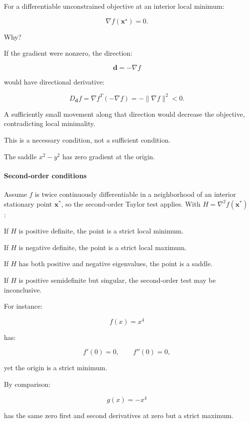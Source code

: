 \hypertarget{02-foundations-ii-ch026-first-order-necessary-condition}{}

For a differentiable unconstrained objective at an interior local minimum:

\[
\boxed{\nabla f(\mathbf x^\star)=0}.
\]

Why?

If the gradient were nonzero, the direction:

\[
\mathbf d=-\nabla f
\]

would have directional derivative:

\[
D_{\mathbf d}f = \nabla f^T(-\nabla f) = -\|\nabla f\|^2<0.
\]

A sufficiently small movement along that direction would decrease the objective, contradicting local minimality.

This is a necessary condition, not a sufficient condition.

The saddle \(x^2-y^2\) has zero gradient at the origin.

\paragraph{Second-order conditions}\label{02-foundations-ii-ch026-second-order-conditions}

\hypertarget{02-foundations-ii-ch026-second-order-conditions}{}

Assume \(f\) is twice continuously differentiable in a neighborhood of an interior stationary point \(\mathbf x^*\), so the second-order Taylor test applies. With \(H=\nabla^2 f(\mathbf x^*)\):

If \(H\) is positive definite, the point is a strict local minimum.

If \(H\) is negative definite, the point is a strict local maximum.

If \(H\) has both positive and negative eigenvalues, the point is a saddle.

If \(H\) is positive semidefinite but singular, the second-order test may be inconclusive.

For instance:

\[
f(x)=x^4
\]

has:

\[
f'(0)=0,\qquad f''(0)=0,
\]

yet the origin is a strict minimum.

By comparison:

\[
g(x)=-x^4
\]

has the same zero first and second derivatives at zero but a strict maximum.

